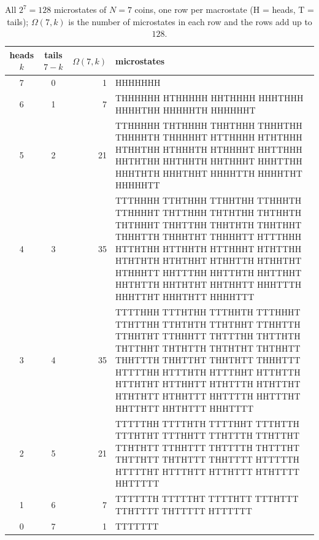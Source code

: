 \documentclass[11pt,a4paper]{article}
\newcommand{\Om}{\Omega}
\begin{document}
\begin{table}[H]
\centering\small
\begin{tabular}{@{}ccrp{10.2cm}@{}}
\toprule
heads $k$ & tails $7-k$ & $\Om(7,k)$ & microstates \\ \midrule
7 & 0 & 1 & {\raggedright\ttfamily\scriptsize HHHHHHH\par} \\
\midrule
6 & 1 & 7 & {\raggedright\ttfamily\scriptsize THHHHHH HTHHHHH HHTHHHH HHHTHHH HHHHTHH HHHHHTH HHHHHHT\par} \\
\midrule
5 & 2 & 21 & {\raggedright\ttfamily\scriptsize TTHHHHH THTHHHH THHTHHH THHHTHH THHHHTH THHHHHT HTTHHHH HTHTHHH HTHHTHH HTHHHTH HTHHHHT HHTTHHH HHTHTHH HHTHHTH HHTHHHT HHHTTHH HHHTHTH HHHTHHT HHHHTTH HHHHTHT HHHHHTT\par} \\
\midrule
4 & 3 & 35 & {\raggedright\ttfamily\scriptsize TTTHHHH TTHTHHH TTHHTHH TTHHHTH TTHHHHT THTTHHH THTHTHH THTHHTH THTHHHT THHTTHH THHTHTH THHTHHT THHHTTH THHHTHT THHHHTT HTTTHHH HTTHTHH HTTHHTH HTTHHHT HTHTTHH HTHTHTH HTHTHHT HTHHTTH HTHHTHT HTHHHTT HHTTTHH HHTTHTH HHTTHHT HHTHTTH HHTHTHT HHTHHTT HHHTTTH HHHTTHT HHHTHTT HHHHTTT\par} \\
\midrule
3 & 4 & 35 & {\raggedright\ttfamily\scriptsize TTTTHHH TTTHTHH TTTHHTH TTTHHHT TTHTTHH TTHTHTH TTHTHHT TTHHTTH TTHHTHT TTHHHTT THTTTHH THTTHTH THTTHHT THTHTTH THTHTHT THTHHTT THHTTTH THHTTHT THHTHTT THHHTTT HTTTTHH HTTTHTH HTTTHHT HTTHTTH HTTHTHT HTTHHTT HTHTTTH HTHTTHT HTHTHTT HTHHTTT HHTTTTH HHTTTHT HHTTHTT HHTHTTT HHHTTTT\par} \\
\midrule
2 & 5 & 21 & {\raggedright\ttfamily\scriptsize TTTTTHH TTTTHTH TTTTHHT TTTHTTH TTTHTHT TTTHHTT TTHTTTH TTHTTHT TTHTHTT TTHHTTT THTTTTH THTTTHT THTTHTT THTHTTT THHTTTT HTTTTTH HTTTTHT HTTTHTT HTTHTTT HTHTTTT HHTTTTT\par} \\
\midrule
1 & 6 & 7 & {\raggedright\ttfamily\scriptsize TTTTTTH TTTTTHT TTTTHTT TTTHTTT TTHTTTT THTTTTT HTTTTTT\par} \\
\midrule
0 & 7 & 1 & {\raggedright\ttfamily\scriptsize TTTTTTT\par} \\

\bottomrule
\end{tabular}
\caption{All $2^7=128$ microstates of $N=7$ coins, one row per macrostate (H = heads, T = tails); $\Om(7,k)$ is the number of microstates in each row and the rows add up to $128$.}
\label{tab:n7full}
\end{table}
\end{document}
